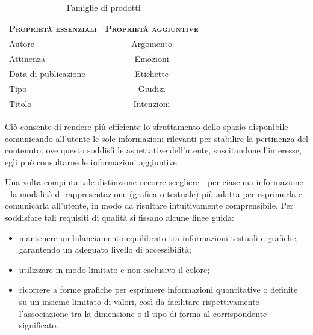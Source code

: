 \begin{table}
	\centering
	\begin{tabular}{|l|c|}
	\hline
	\textsc{Proprietà essenziali} & \textsc{Proprietà aggiuntive} \\ \hline
	Autore  & Argomento \\
	Attinenza & Emozioni\\
	Data di publicazione & Etichette \\
	Tipo & Giudizi \\
	Titolo & Intenzioni \\ \hline
	\end{tabular}
	\caption{Famiglie di prodotti}
	\label{tab:tesi:stage:design:tipi-proprietà}
\end{table}

Ciò consente di rendere più efficiente lo sfruttamento dello spazio disponibile comunicando all'utente le sole informazioni rilevanti per stabilire la pertinenza del contenuto: ove questo soddisfi le aspettative dell'utente, suscitandone l'interesse, egli può consultarne le informazioni aggiuntive.

Una volta compiuta tale distinzione occorre scegliere - per ciascuna informazione - la modalità di rappresentazione (grafica o testuale) più adatta per esprimerla e comunicarla all'utente, in modo da risultare intuitivamente comprensibile. Per soddisfare tali requisiti di qualità si fissano alcune linee guida:
\begin{itemize}
  \item mantenere un bilanciamento equilibrato tra informazioni testuali e grafiche, garantendo un adeguato livello di accessibilità; %
  \item utilizzare in modo limitato e non esclusivo il colore;
  \item ricorrere a forme grafiche per esprimere informazioni quantitative o definite su un insieme limitato di valori, così da facilitare rispettivamente l'associazione tra la dimensione o il tipo di forma al corrispondente significato.
\end{itemize}
 

